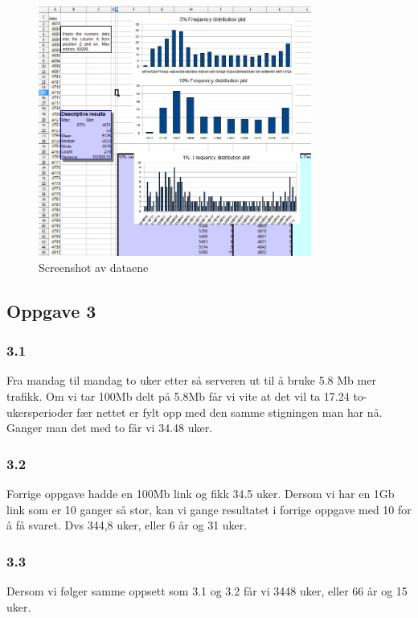 \documentclass[a4paper, norsk, 12pt]{article}
\begin{document}
\begin{figure}[h!]
 \centering
  \includegraphics[width=0.8\textwidth]{Images/Insert_i_TF_calc.jpg}
 \caption{Screenshot av dataene}
\end{figure}

\subsection{Oppgave 3}
\subsubsection*{3.1}
Fra mandag til mandag to uker etter så serveren ut til å bruke 5.8 Mb mer trafikk. Om vi tar 100Mb delt på 5.8Mb får vi vite at det vil ta 17.24 to-ukersperioder fær nettet er fylt opp med den samme stigningen man har nå. Ganger man det med to får vi 34.48 uker.

\subsubsection*{3.2}
Forrige oppgave hadde en 100Mb link og fikk 34.5 uker. Dersom vi har en 1Gb link som er 10 ganger så stor, kan vi gange resultatet i forrige oppgave med 10 for å få svaret. Dvs 344,8 uker, eller 6 år og 31 uker.

\subsubsection*{3.3}
Dersom vi følger samme oppsett som 3.1 og 3.2 får vi 3448 uker, eller 66 år og 15 uker.
\end{document}
